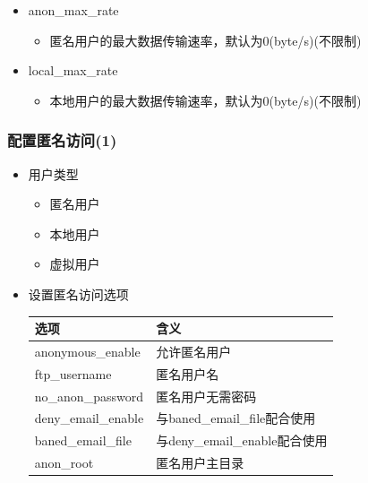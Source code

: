 \documentclass[xcolor=svgnames,presentation]{beamer}
\begin{document}
\begin{frame}
\begin{itemize}
\begin{itemize}
\item anon\_max\_rate
\label{sec-3-4-1-7}%
\begin{itemize}

\item 匿名用户的最大数据传输速率，默认为0(byte/s)(不限制)
\label{sec-3-4-1-7-1}%
\end{itemize} %

\item local\_max\_rate
\label{sec-3-4-1-8}%
\begin{itemize}

\item 本地用户的最大数据传输速率，默认为0(byte/s)(不限制)
\label{sec-3-4-1-8-1}%
\end{itemize} %
\end{itemize} %
\end{itemize} %
\end{frame}
\begin{frame}
\frametitle{配置匿名访问(1)}
\label{sec-3-5}
\begin{itemize}

\item 用户类型
\label{sec-3-5-1}%
\begin{itemize}

\item 匿名用户
\label{sec-3-5-1-1}%

\item 本地用户
\label{sec-3-5-1-2}%

\item 虚拟用户
\label{sec-3-5-1-3}%
\end{itemize} %

\item 设置匿名访问选项\\
\label{sec-3-5-2}%
\begin{center}
\begin{tabular}{ll}
 选项                 &  含义                           \\
\hline
 anonymous\_enable    &  允许匿名用户                   \\
 ftp\_username        &  匿名用户名                     \\
 no\_anon\_password   &  匿名用户无需密码               \\
 deny\_email\_enable  &  与baned\_email\_file配合使用   \\
 baned\_email\_file   &  与deny\_email\_enable配合使用  \\
 anon\_root           &  匿名用户主目录                 \\
\end{tabular}
\end{center}


\end{itemize} %
\end{frame}
\end{document}
